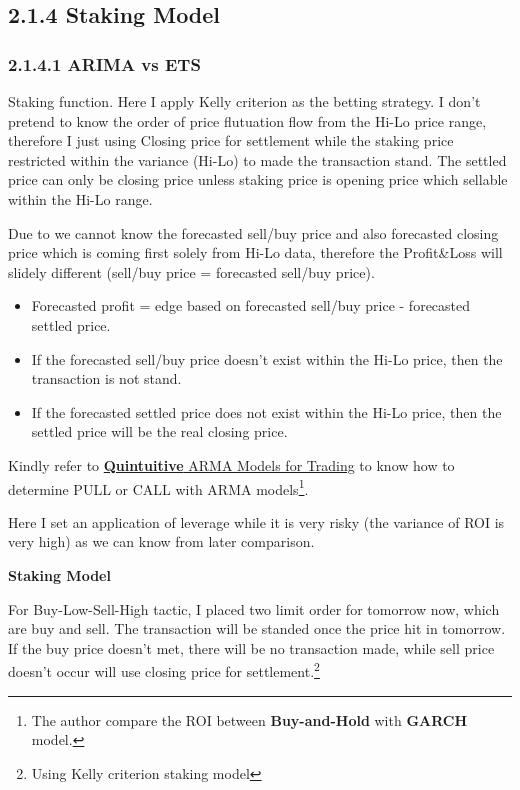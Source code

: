 \documentclass[]{tufte-book}
\providecommand{\tightlist}{%
  \setlength{\itemsep}{0pt}\setlength{\parskip}{0pt}}
\begin{document}
\subsection{2.1.4 Staking Model}\label{staking-model}

\subsubsection{2.1.4.1 ARIMA vs ETS}\label{arima-vs-ets-2}

Staking function. Here I apply Kelly criterion as the betting strategy.
I don't pretend to know the order of price flutuation flow from the
Hi-Lo price range, therefore I just using Closing price for settlement
while the staking price restricted within the variance (Hi-Lo) to made
the transaction stand. The settled price can only be closing price
unless staking price is opening price which sellable within the Hi-Lo
range.

Due to we cannot know the forecasted sell/buy price and also forecasted
closing price which is coming first solely from Hi-Lo data, therefore
the Profit\&Loss will slidely different (sell/buy price = forecasted
sell/buy price).

\begin{itemize}
\tightlist
\item
  Forecasted profit = edge based on forecasted sell/buy price -
  forecasted settled price.
\item
  If the forecasted sell/buy price doesn't exist within the Hi-Lo price,
  then the transaction is not stand.
\item
  If the forecasted settled price does not exist within the Hi-Lo price,
  then the settled price will be the real closing price.
\end{itemize}

Kindly refer to
\href{http://www.quintutive.com2012/08/22/arma-models-for-trading}{{\textbf{Quintuitive}
ARMA Models for Trading}} to know how to determine PULL or CALL with
ARMA models\footnote{The author compare the ROI between
  \textbf{Buy-and-Hold} with \textbf{GARCH} model.}.

Here I set an application of leverage while it is very risky (the
variance of ROI is very high) as we can know from later comparison.

\textbf{Staking Model}

For Buy-Low-Sell-High tactic, I placed two limit order for tomorrow now,
which are buy and sell. The transaction will be standed once the price
hit in tomorrow. If the buy price doesn't met, there will be no
transaction made, while sell price doesn't occur will use closing price
for settlement.\footnote{Using Kelly criterion staking model}
\end{document}
